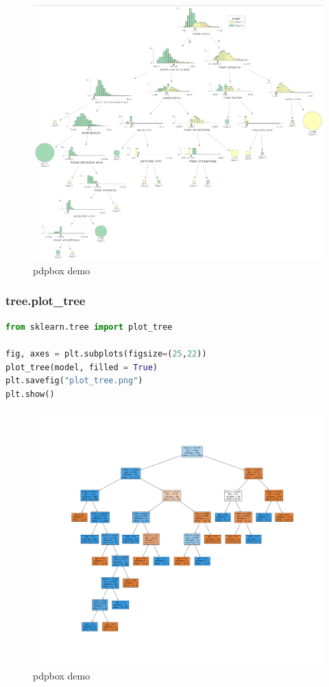 \begin{figure}[ht]
    \centering
    \includegraphics[width=1.0\textwidth]{images/dtreeviz.png}
    \caption{pdpbox demo}
    \label{fig:enter-label}
\end{figure}

\newpage

\subsubsection{tree.plot\_tree}
\begin{lstlisting}[language=Python]
from sklearn.tree import plot_tree

fig, axes = plt.subplots(figsize=(25,22))
plot_tree(model, filled = True)
plt.savefig("plot_tree.png")
plt.show()
\end{lstlisting}

\begin{figure}[ht]
    \centering
    \includegraphics[width=1.0\textwidth]{images/plot_tree.png}
    \caption{pdpbox demo}
    \label{fig:enter-label}
\end{figure}


